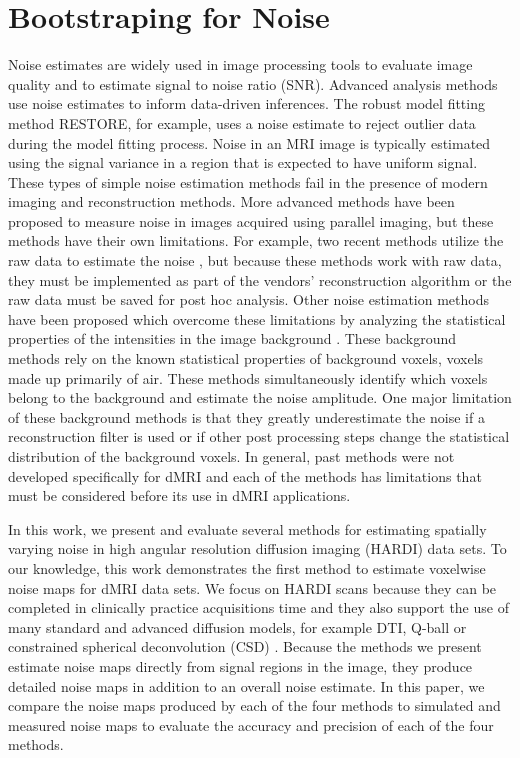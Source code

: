 \chapter{Bootstraping for Noise}

Noise estimates are widely used in image processing tools to evaluate
image quality and to estimate signal to noise ratio (SNR). Advanced
analysis methods use noise estimates to inform data-driven inferences.
The robust model fitting method RESTORE, for example, uses a noise
estimate to reject outlier data during the model fitting process. Noise
in an MRI image is typically estimated using the signal variance in a
region that is expected to have uniform signal. These types of simple
noise estimation methods fail in the presence of modern imaging and
reconstruction methods. More advanced methods have been proposed to
measure noise in images acquired using parallel imaging, but these
methods have their own limitations. For example, two recent methods
utilize the raw data to estimate the noise \cite{Robson_2008,Kellman_2005}, but because these methods work with raw data, they must be implemented as part of the
vendors' reconstruction algorithm or the raw data must be saved for post
hoc analysis. Other noise estimation methods have been proposed which
overcome these limitations by analyzing the statistical properties of
the intensities in the image background \cite{19346143,27845653}. These
background methods rely on the known statistical properties of
background voxels, voxels made up primarily of air. These methods
simultaneously identify which voxels belong to the background and
estimate the noise amplitude. One major limitation of these background
methods is that they greatly underestimate the noise if a reconstruction
filter is used or if other post processing steps change the statistical
distribution of the background voxels\cite{Dietrich_2007}. In general,
past methods were not developed specifically for dMRI and each of the
methods has limitations that must be considered before its use in dMRI
applications.

In this work, we present and evaluate several methods for estimating
spatially varying noise in high angular resolution diffusion imaging
(HARDI) data sets. To our knowledge, this work demonstrates the first
method to estimate voxelwise noise maps for dMRI data sets. We focus on
HARDI scans because they can be completed in clinically practice
acquisitions time and they also support the use of many standard and
advanced diffusion models, for example DTI, Q-ball \cite{Tuch_2004}
 or constrained spherical deconvolution (CSD) \cite{Tournier_2007}. Because the
methods we present estimate noise maps directly from signal regions in
the image, they produce detailed noise maps in addition to an overall
noise estimate. In this paper, we compare the noise maps produced by each
of the four methods to simulated and measured noise maps to evaluate the
accuracy and precision of each of the four methods.